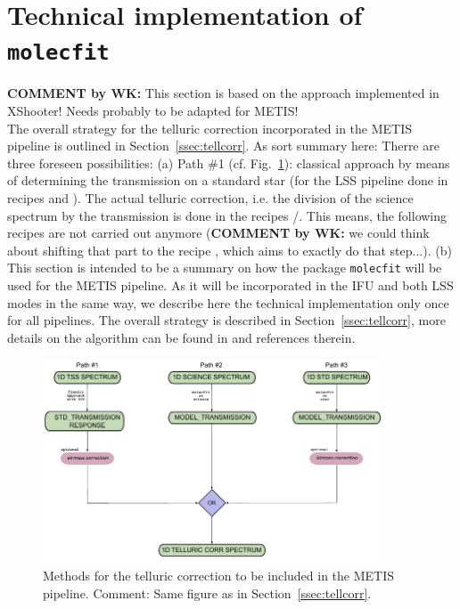 \section{Technical implementation of \texttt{molecfit}}\label{app:mf}
\textbf{COMMENT by WK:} This section is based on the approach implemented in XShooter! Needs probably to be adapted for METIS!\\[1cm]

The overall strategy for the telluric correction incorporated in the METIS pipeline is outlined in Section~\ref{ssec:tellcorr}. As sort summary here: Therre are three foreseen possibilities: (a) Path \#1 (cf. Fig.~\ref{Fig:tellcorrmethods}): classical approach by means of determining the transmission on a standard star (for the LSS pipeline done in recipes  and ). The actual telluric correction, i.e. the division of the science spectrum by the transmission is done in the recipes /. This means, the following recipes are not carried out anymore (\textbf{COMMENT by WK:} we could think about shifting that part to the recipe , which aims to exactly do that step...). (b) 
This section is intended to be a summary on how the package \texttt{molecfit} will be used for the \ac{METIS} pipeline. As it will be incorporated in the \ac{IFU} and both \ac{LSS} modes in the same way, we describe here the technical implementation only once for all pipelines. The overall strategy is described in Section~\ref{ssec:tellcorr}, more details on the \mf algorithm can be found in \cite{molecfit} and references therein.
\begin{figure}[ht]
  \centering
  \includegraphics[width=0.9\textwidth]{figures/tell_corr_methods.pdf}
    \caption[Methods for the telluric correction to be included in the METIS pipeline]{%
        Methods for the telluric correction to be included in the \ac{METIS} pipeline. Comment: Same figure as in Section~\ref{ssec:tellcorr}. }
  \label{Fig:tellcorrmethods}
\end{figure}

